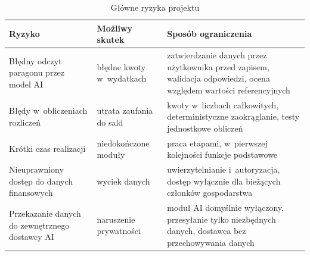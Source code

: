 \begin{table}[H]
  \centering
  \caption{Główne ryzyka projektu}
  \label{tab:ryzyka}
  \begin{tabularx}{\textwidth}{@{}>{\raggedright\arraybackslash}p{}>{\raggedright\arraybackslash}p{}L@{}}
    \toprule
    Ryzyko & Możliwy skutek & Sposób ograniczenia \\
    \midrule
    Błędny odczyt paragonu przez model AI & błędne kwoty w~wydatkach & zatwierdzanie danych przez użytkownika przed zapisem, walidacja odpowiedzi, ocena względem wartości referencyjnych \\
    Błędy w~obliczeniach rozliczeń & utrata zaufania do sald & kwoty w~liczbach całkowitych, deterministyczne zaokrąglanie, testy jednostkowe obliczeń \\
    Krótki czas realizacji & niedokończone moduły & praca etapami, w~pierwszej kolejności funkcje podstawowe \\
    Nieuprawniony dostęp do danych finansowych & wyciek danych & uwierzytelnianie i~autoryzacja, dostęp wyłącznie dla bieżących członków gospodarstwa \\
    Przekazanie danych do zewnętrznego dostawcy AI & naruszenie prywatności & moduł AI domyślnie wyłączony, przesyłanie tylko niezbędnych danych, dostawca bez przechowywania danych \\
    \bottomrule
  \end{tabularx}
\end{table}
